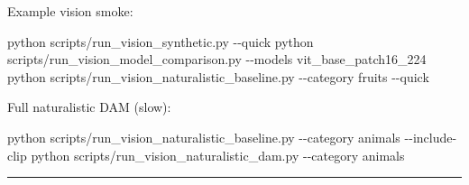 \documentclass[
  11pt,
]{memoir}
\newenvironment{Shaded}{}{}
\newcommand{\AttributeTok}[1]{\textcolor[rgb]{0.49,0.56,0.16}{#1}}
\newcommand{\ExtensionTok}[1]{#1}
\newcommand{\NormalTok}[1]{#1}
\begin{document}
Example vision smoke:

\begin{Shaded}
\begin{Highlighting}[]
\ExtensionTok{python}\NormalTok{ scripts/run\_vision\_synthetic.py }\AttributeTok{{-}{-}quick}
\ExtensionTok{python}\NormalTok{ scripts/run\_vision\_model\_comparison.py }\AttributeTok{{-}{-}models}\NormalTok{ vit\_base\_patch16\_224}
\ExtensionTok{python}\NormalTok{ scripts/run\_vision\_naturalistic\_baseline.py }\AttributeTok{{-}{-}category}\NormalTok{ fruits }\AttributeTok{{-}{-}quick}
\end{Highlighting}
\end{Shaded}

Full naturalistic DAM (slow):

\begin{Shaded}
\begin{Highlighting}[]
\ExtensionTok{python}\NormalTok{ scripts/run\_vision\_naturalistic\_baseline.py }\AttributeTok{{-}{-}category}\NormalTok{ animals }\AttributeTok{{-}{-}include{-}clip}
\ExtensionTok{python}\NormalTok{ scripts/run\_vision\_naturalistic\_dam.py }\AttributeTok{{-}{-}category}\NormalTok{ animals}
\end{Highlighting}
\end{Shaded}

\begin{center}\rule{0.5\linewidth}{0.5pt}\end{center}

\backmatter
\end{document}
